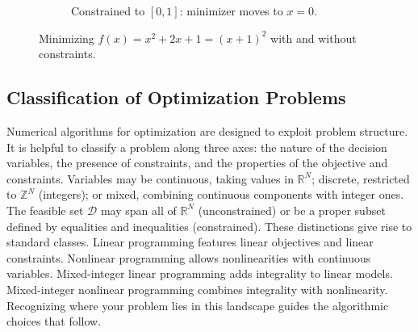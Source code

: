 \begin{exampleBox}
\begin{figure}[H]
\begin{subfigure}{0.47\textwidth}
        \caption{Constrained to $[0,1]$: minimizer moves to $x=0$.}
        \end{subfigure}
        \caption{Minimizing $f(x)=x^2+2x+1=(x+1)^2$ with and without constraints.}
    \end{figure}
\end{exampleBox}


\subsection{Classification of Optimization Problems}
Numerical algorithms for optimization are designed to exploit problem structure. It is helpful to classify a problem along three axes: the nature of the decision variables, the presence of constraints, and the properties of the objective and constraints. Variables may be continuous, taking values in $\mathbb{R}^N$; discrete, restricted to $\mathbb{Z}^N$ (integers); or mixed, combining continuous components with integer ones. The feasible set $\mathcal{D}$ may span all of $\mathbb{R}^N$ (unconstrained) or be a proper subset defined by equalities and inequalities (constrained).
These distinctions give rise to standard classes. Linear programming features linear objectives and linear constraints. Nonlinear programming allows nonlinearities with continuous variables. Mixed-integer linear programming adds integrality to linear models. Mixed-integer nonlinear programming combines integrality with nonlinearity. Recognizing where your problem lies in this landscape guides the algorithmic choices that follow.

